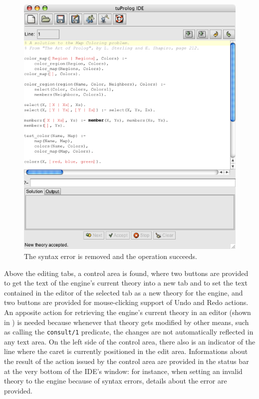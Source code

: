 \begin{figure}
\centering
\includegraphics[scale=0.60]{images/setTheorySucceeded}
\caption{The syntax error is removed and the  operation succeeds.}
\label{set-theory-succeeded}
\end{figure}

Above the editing tabs, a control area is found, where two buttons are provided to get the text of the engine's current theory into a new tab and to set the text contained in the editor of the selected tab as a new theory for the engine, and two buttons are provided for mouse-clicking support of Undo and Redo
actions.
%
An apposite action for retrieving the engine's current theory in an editor (shown in ) is needed because whenever that theory gets modified by other means, such as calling the \texttt{consult/1} predicate, the changes are not automatically reflected in any text area.
%
On the left side of the control area, there also is an indicator of the line where the caret is currently positioned in the edit area.
%
Informations about the result of the action issued by the control area are provided in the status bar at the very bottom of the IDE's window:
%
for instance, when setting an invalid theory to the engine because of syntax errors, details about the error are provided.

